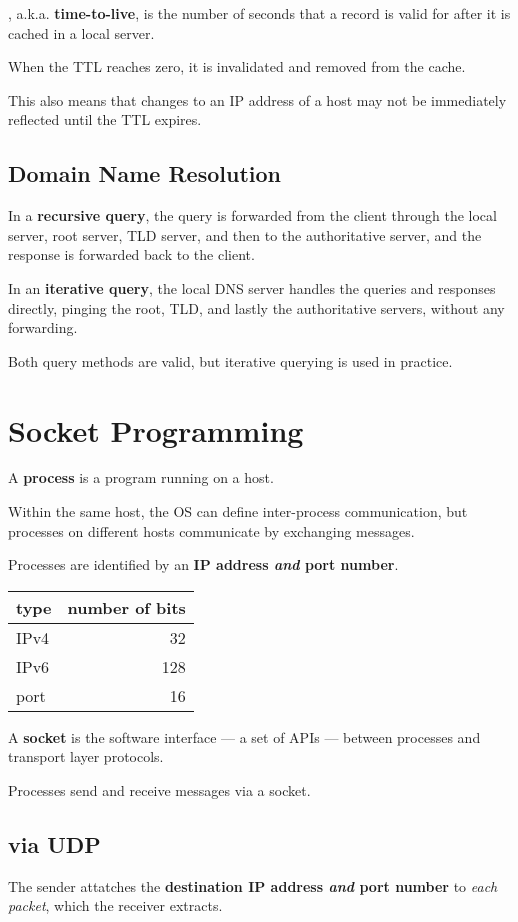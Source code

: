 , a.k.a. \textbf{time-to-live}, is the number of seconds that a record is valid for
after it is cached in a local server.

When the TTL reaches zero, it is invalidated and removed from the cache.

This also means that changes to an IP address of a host may not be immediately reflected
until the TTL expires.

\subsection{Domain Name Resolution}
In a \textbf{recursive query}, the query is forwarded from the client through the local server,
root server, TLD server, and then to the authoritative server, and the response is forwarded back 
to the client.

In an \textbf{iterative query}, the local DNS server handles the queries and responses directly,
pinging the root, TLD, and lastly the authoritative servers, without any forwarding.

Both query methods are valid, but iterative querying is used in practice.


\section{Socket Programming}
A \textbf{process} is a program running on a host.

Within the same host, the OS can define inter-process communication, but
processes on different hosts communicate by exchanging messages.

Processes are identified by an \textbf{IP address \emph{and} port number}.

\begin{tabular}{l|r} \hline
    \textbf{type} & \textbf{number of bits} \\ \hline
    IPv4 & 32 \\
    IPv6 & 128 \\
    port & 16 \\ \hline
\end{tabular}

A \textbf{socket} is the software interface --- a set of APIs --- 
between processes and transport layer protocols.

Processes send and receive messages via a socket.

\subsection{via UDP}
The sender attatches the \textbf{destination IP address \emph{and} port number} to \emph{each packet},
which the receiver extracts.

